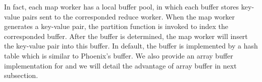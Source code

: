 


In fact, each map worker has a local buffer pool, in which each buffer stores key-value pairs sent to the corresponded reduce worker.
When the map worker generates a key-value pair, the partition function is invoked to index the corresponded buffer.
After the buffer is determined, the map worker will insert the key-value pair into this buffer.
In default, the buffer is implemented by a hash table which is similar to Phoenix's buffer.
We also provide an array buffer implementation for \myds and we will detail the advantage of array buffer in next subsection.







